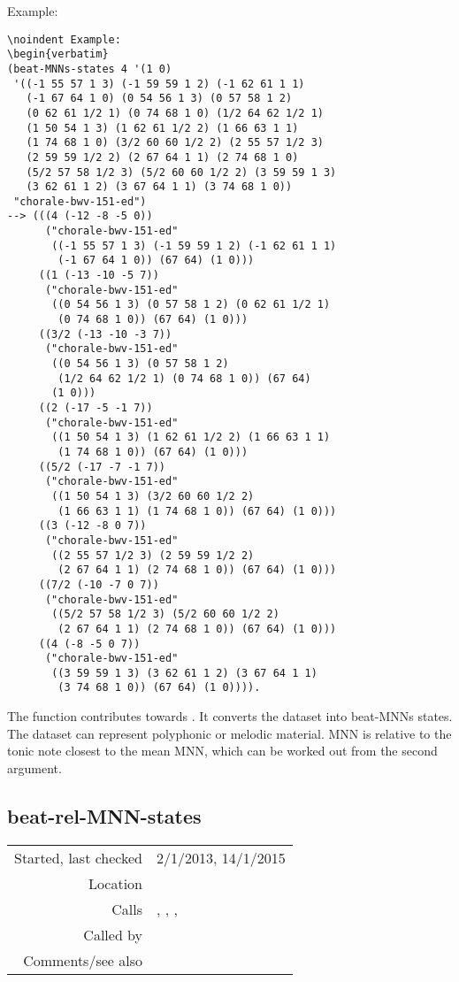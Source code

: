 \vspace{0.5cm}
\noindent Example:
\begin{verbatim}
\noindent Example:
\begin{verbatim}
(beat-MNNs-states 4 '(1 0)
 '((-1 55 57 1 3) (-1 59 59 1 2) (-1 62 61 1 1)
   (-1 67 64 1 0) (0 54 56 1 3) (0 57 58 1 2)
   (0 62 61 1/2 1) (0 74 68 1 0) (1/2 64 62 1/2 1)
   (1 50 54 1 3) (1 62 61 1/2 2) (1 66 63 1 1)
   (1 74 68 1 0) (3/2 60 60 1/2 2) (2 55 57 1/2 3)
   (2 59 59 1/2 2) (2 67 64 1 1) (2 74 68 1 0)
   (5/2 57 58 1/2 3) (5/2 60 60 1/2 2) (3 59 59 1 3)
   (3 62 61 1 2) (3 67 64 1 1) (3 74 68 1 0))
 "chorale-bwv-151-ed")
--> (((4 (-12 -8 -5 0))
      ("chorale-bwv-151-ed"
       ((-1 55 57 1 3) (-1 59 59 1 2) (-1 62 61 1 1)
        (-1 67 64 1 0)) (67 64) (1 0)))
     ((1 (-13 -10 -5 7))
      ("chorale-bwv-151-ed"
       ((0 54 56 1 3) (0 57 58 1 2) (0 62 61 1/2 1)
        (0 74 68 1 0)) (67 64) (1 0)))
     ((3/2 (-13 -10 -3 7))
      ("chorale-bwv-151-ed"
       ((0 54 56 1 3) (0 57 58 1 2)
        (1/2 64 62 1/2 1) (0 74 68 1 0)) (67 64)
       (1 0)))
     ((2 (-17 -5 -1 7))
      ("chorale-bwv-151-ed"
       ((1 50 54 1 3) (1 62 61 1/2 2) (1 66 63 1 1)
        (1 74 68 1 0)) (67 64) (1 0)))
     ((5/2 (-17 -7 -1 7))
      ("chorale-bwv-151-ed"
       ((1 50 54 1 3) (3/2 60 60 1/2 2)
        (1 66 63 1 1) (1 74 68 1 0)) (67 64) (1 0)))
     ((3 (-12 -8 0 7))
      ("chorale-bwv-151-ed"
       ((2 55 57 1/2 3) (2 59 59 1/2 2)
        (2 67 64 1 1) (2 74 68 1 0)) (67 64) (1 0)))
     ((7/2 (-10 -7 0 7))
      ("chorale-bwv-151-ed"
       ((5/2 57 58 1/2 3) (5/2 60 60 1/2 2)
        (2 67 64 1 1) (2 74 68 1 0)) (67 64) (1 0)))
     ((4 (-8 -5 0 7))
      ("chorale-bwv-151-ed"
       ((3 59 59 1 3) (3 62 61 1 2) (3 67 64 1 1)
        (3 74 68 1 0)) (67 64) (1 0)))).
\end{verbatim}

\noindent The function contributes towards
\cite{collins2012}. It converts the dataset into
beat-MNNs states. The dataset can represent
polyphonic or melodic material. MNN is relative to
the tonic note closest to the mean MNN, which can be
worked out from the second argument.


\subsection*{beat-rel-MNN-states}\label{fun:beat-rel-MNN-states}

\vspace{0.3cm}
\begin{tabular}{r|p{8cm}}
Started, last checked & 2/1/2013, 14/1/2015 \\
Location & \nameref{sec:beat-rel-MNN-states} \\
Calls & \nameref{fun:centre-dataset}, \nameref{fun:fifths-step-mode2MNN-MPN} , \nameref{fun:nth-list-of-lists}, \nameref{fun:segments-strict} \\
Called by & \\
Comments/see also &
\end{tabular}

